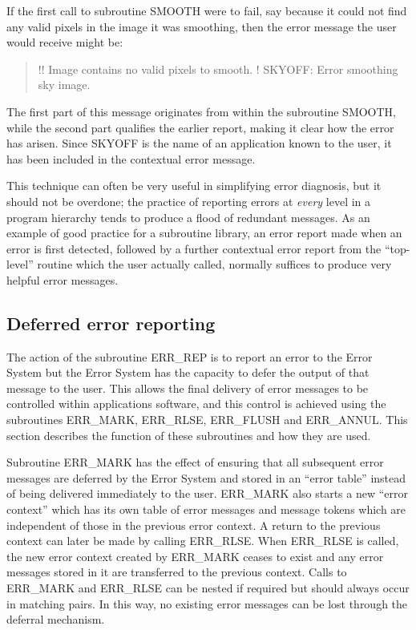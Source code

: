 \documentclass[twoside,11pt]{starlink}
\begin{document}
If the first call to subroutine SMOOTH were to fail, say because it could not
find any valid pixels in the image it was smoothing, then the error message
the user would receive might be:

\begin {quote}
\begin {small}
\begin{terminalv}
!! Image contains no valid pixels to smooth.
!  SKYOFF: Error smoothing sky image.
\end{terminalv}
\end {small}
\end {quote}

The first part of this message originates from within the subroutine SMOOTH,
while the second part qualifies the earlier report, making it clear how the
error has arisen.
Since SKYOFF is the name of an application known to the user, it has been
included in the contextual error message.

This technique can often be very useful in simplifying error diagnosis, but
it should not be overdone; the practice of reporting errors at \emph{every}
level in a program hierarchy tends to produce a flood of redundant messages.
As an example of good practice for a subroutine library, an error report made
when an error is first detected, followed by a further contextual error report
from the ``top-level'' routine which the user actually called, normally
suffices to produce very helpful error messages.


\subsection{Deferred error reporting \label{errdef_sect}}

The action of the subroutine ERR\_REP is to report an error to the
Error System but the Error System has the capacity to defer the output of
that message to the user.
This allows the final delivery of error messages to be controlled within
applications software, and this control is achieved using the subroutines
ERR\_MARK, ERR\_RLSE, ERR\_FLUSH and ERR\_ANNUL.
This section describes the function of these subroutines and how they are
used.

Subroutine ERR\_MARK has the effect of ensuring that all subsequent error
messages are deferred by the Error System and stored in an ``error table''
instead of being delivered immediately to the user.
ERR\_MARK also starts a new ``error context'' which has its own table of error
messages and message tokens which are independent of those in the previous
error context.
A return to the previous context can later be made by calling ERR\_RLSE.
When ERR\_RLSE is called, the new error context created by ERR\_MARK ceases
to exist and any error messages stored in it are transferred to the
previous context.
Calls to ERR\_MARK and ERR\_RLSE can be nested if required but should always
occur in matching pairs.
In this way, no existing error messages can be lost through the deferral
mechanism.
\end{document}
